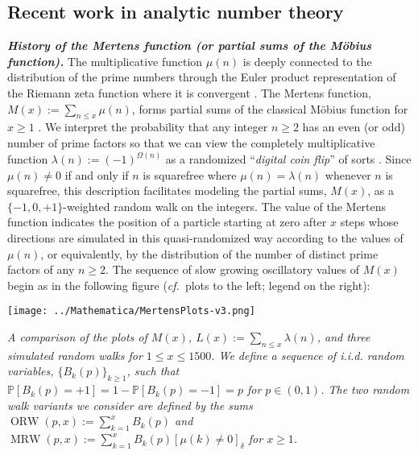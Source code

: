 \documentclass[10pt,reqno,letterpaper]{article}
\theoremstyle{plain}
\numberwithin{theorem}{section}
\theoremstyle{definition}
\newcommand{\cf}[0]{\emph{cf.}\ }
\newcommand{\Iverson}[1]{\ensuremath{\left[#1\right]_{\delta}}}
\newcommand{\seqnum}[1]{\href{http://oeis.org/#1}{\color{Gray!50!Black}{\underline{#1}}}}
\begin{document}
\subsection{Recent work in analytic number theory}
\label{subSection_PriorWork_MertensFunctionMx} 

\noindent 
{\small \textbf{\emph{History of the Mertens function (or partial sums of the M\"obius function).}}} 
The multiplicative function $\mu(n)$ is deeply connected to the 
distribution of the prime numbers through the Euler product representation of the Riemann zeta 
function where it is convergent \cite{APOSTOLANUMT}. 
The Mertens function, $M(x) := \sum_{n \leq x} \mu(n)$, forms partial sums 
of the classical M\"obius function for $x \geq 1$ \cite[\seqnum{A008683}; \seqnum{A002321}]{OEIS}.
We interpret the probability that any integer $n \geq 2$ has an even (or odd) number of prime 
factors so that we can view the completely multiplicative function $\lambda(n) := (-1)^{\Omega(n)}$ as a 
randomized ``\emph{digital coin flip}'' of sorts 
\cite[\seqnum{A008836}; \seqnum{A002819}]{OEIS}. Since $\mu(n) \neq 0$ if and only if 
$n$ is squarefree where $\mu(n) = \lambda(n)$ whenever 
$n$ is squarefree, this description facilitates modeling the 
partial sums, $M(x)$, as a $\{-1,0,+1\}$-weighted random walk on the integers. 
The value of the Mertens function indicates the position of a particle starting at zero 
after $x$ steps whose directions are simulated in this quasi-randomized way according to 
the values of $\mu(n)$, or equivalently, by the distribution of the number of distinct prime factors of 
any $n \geq 2$. 
The sequence of slow growing oscillatory values of $M(x)$ begin 
as in the following figure (\cf plots to the left; legend on the right): \\[0.4mm] 
\begin{minipage}{0.48\textwidth}
     \texttt{[image: ../Mathematica/MertensPlots-v3.png]}
\end{minipage} \hfill
\begin{minipage}{0.485\textwidth}
\begin{tcolorbox}[width=\linewidth,halign=justify,boxsep=0mm,arc=2.25mm,colframe=gray!49]
\em\small 
A comparison of the plots of $M(x)$, $L(x) := \sum_{n \leq x} \lambda(n)$, and 
three simulated random walks for $1 \leq x \leq 1500$. 
We define a sequence of i.i.d. random variables, $\{B_k(p)\}_{k \geq 1}$, such that 
$\mathbb{P}[B_k(p) = +1] = 1 - \mathbb{P}[B_k(p) = -1] = p$ for $p \in (0, 1)$. 
The two random walk variants we consider are defined by the sums 
$\operatorname{ORW}(p, x) := \sum_{k=1}^{x} B_k(p)$ and 
$\operatorname{MRW}(p, x) := \sum_{k=1}^{x} B_k(p) \Iverson{\mu(k) \neq 0}$ for $x \geq 1$. 
\end{tcolorbox}
\end{minipage}
\end{document}
